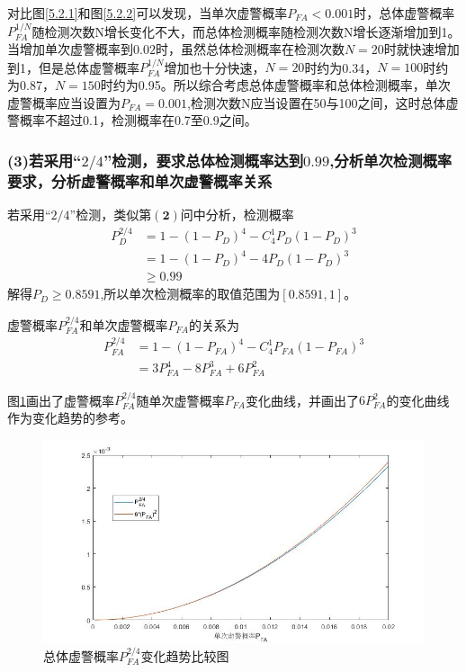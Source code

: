\documentclass[fontset=windows]{article}
\numberwithin{figure}{section}
\begin{document}
对比图\ref*{5.2.1}和图\ref*{5.2.2}可以发现，当单次虚警概率\(P_{FA}<0.001\)时，总体虚警概率\(P^{1/N}_{FA}\)随检测次数N增长变化不大，而总体检测概率随检测次数N增长逐渐增加到1。当增加单次虚警概率到\(0.02\)时，虽然总体检测概率在检测次数\(N=20\)时就快速增加到1，但是总体虚警概率\(P^{1/N}_{FA}\)增加也十分快速，\(N=20\)时约为0.34，\(N=100\)时约为0.87，\(N=150\)时约为0.95。所以综合考虑总体虚警概率和总体检测概率，单次虚警概率应当设置为\(P_{FA}=0.001\),检测次数N应当设置在50与100之间，这时总体虚警概率不超过0.1，检测概率在0.7至0.9之间。

\subsubsection*{(3)若采用“\(2/4\)”检测，要求总体检测概率达到\(0.99\),分析单次检测概率要求，分析虚警概率和单次虚警概率关系}

若采用“\(2/4\)”检测，类似第\(\mathbf{(2)}\)问中分析，检测概率
\begin{align*}
	P^{2/4}_D & =1-(1-P_D)^4-C_4^1P_D(1-P_D)^3 \\
	          & =1-(1-P_D)^4-4P_D(1-P_D)^3     \\
	          & \geqslant0.99
\end{align*}
解得\(P_D\geqslant 0.8591\),所以单次检测概率的取值范围为\([0.8591,1]\)。

虚警概率\(P^{2/4}_{FA}\)和单次虚警概率\(P_{FA}\)的关系为
\begin{align*}
	P^{2/4}_{FA} & =1-(1-P_{FA})^4-C_4^1P_{FA}(1-P_{FA})^3 \\
	             & =3P_{FA}^4-8P_{FA}^3+6P_{FA}^2
\end{align*}

图\ref*{5.2.3}画出了虚警概率\(P^{2/4}_{FA}\)随单次虚警概率\(P_{FA}\)变化曲线，并画出了\(6P_{FA}^2\)的变化曲线作为变化趋势的参考。
\begin{figure}[H]
	\centering
	\includegraphics[scale=0.5]{fig2_3.jpg}
	\caption{总体虚警概率\(P^{2/4}_{FA}\)变化趋势比较图}
	\label{5.2.3}
\end{figure}
\end{document}
